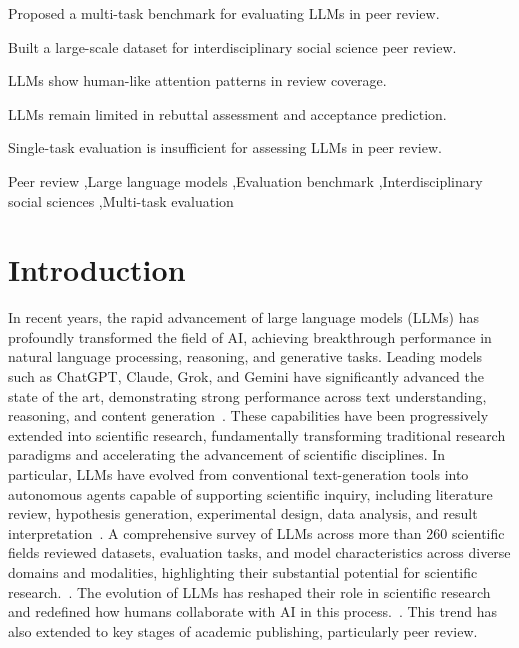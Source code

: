 \documentclass[preprint,10pt,times]{elsarticle}
\begin{document}
\begin{frontmatter}
\begin{highlights}
\item Proposed a multi-task benchmark for evaluating LLMs in peer review.
\item Built a large-scale dataset for interdisciplinary social science peer review.
\item LLMs show human-like attention patterns in review coverage.
\item LLMs remain limited in rebuttal assessment and acceptance prediction.
\item Single-task evaluation is insufficient for assessing LLMs in peer review.
\end{highlights}

\begin{keyword}
Peer review \sep Large language models \sep Evaluation benchmark \sep Interdisciplinary social sciences \sep Multi-task evaluation
\end{keyword}

\end{frontmatter}

\section{Introduction}
\label{sec:intro}

In recent years, the rapid advancement of large language models (LLMs) has profoundly transformed the field of AI, achieving breakthrough performance in natural language processing, reasoning, and generative tasks. Leading models such as ChatGPT, Claude, Grok, and Gemini have significantly advanced the state of the art, demonstrating strong performance across text understanding, reasoning, and content generation~\cite{ref1}. These capabilities have been progressively extended into scientific research, fundamentally transforming traditional research paradigms and accelerating the advancement of scientific disciplines. In particular, LLMs have evolved from conventional text-generation tools into autonomous agents capable of supporting scientific inquiry, including literature review, hypothesis generation, experimental design, data analysis, and result interpretation~\cite{ref2}. A comprehensive survey of LLMs across more than 260 scientific fields reviewed datasets, evaluation tasks, and model characteristics across diverse domains and modalities, highlighting their substantial potential for scientific research.~\cite{ref3}. The evolution of LLMs has reshaped their role in scientific research and redefined how humans collaborate with AI in this process.~\cite{ref4}. This trend has also extended to key stages of academic publishing, particularly peer review.
\end{document}
